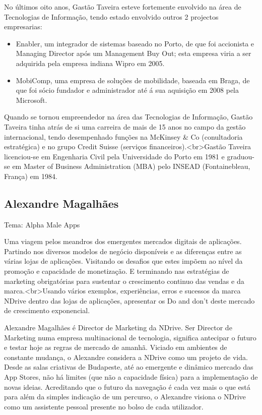 No últimos oito anos, Gastão Taveira esteve fortemente envolvido na 
área de Tecnologias de Informação, tendo estado envolvido outros 2 
projectos empresarias:\\
\begin{itemize}
\item Enabler, um integrador de sistemas baseado no Porto, de que foi accionista e Managing Director após um Management Buy Out; esta empresa viria a ser adquirida pela empresa indiana Wipro em 2005.
\item MobiComp, uma empresa de soluções de mobilidade, baseada em Braga, de que foi sócio fundador e administrador até á sua aquisição em 2008 pela Microsoft.
\end{itemize}

Quando se tornou empreendedor na área das Tecnologias de Informação, 
Gastão Taveira tinha atrás de si uma carreira de mais de 15 anos no campo da gestão internacional, tendo desempenhado funções na McKinsey \& Co (conultadoria estratégica) e no grupo Credit Suisse (serviços financeiros).<br>Gastão Taveira licenciou-se em Engenharia Civil pela Universidade do Porto em 1981 e graduou-se em Master of Business Administration (MBA) pelo INSEAD (Fontainebleau, França) em 1984.

\subsection{Alexandre Magalhães}
Tema: Alpha Male Apps

Uma viagem pelos meandros dos emergentes mercados digitais de aplicações. Partindo nos diversos modelos de negócio disponíveis e as diferenças entre as várias lojas de aplicações. Visitando os desafios que estes impõem ao nível da promoção e capacidade de monetização. E terminando nas estratégias de marketing obrigatórias para sustentar o crescimento continuo das vendas e da marca.<br>Usando vários exemplos, experiências, erros e sucessos da marca NDrive dentro das lojas de aplicações, apresentar os Do and don't deste mercado de crescimento exponencial.

Alexandre Magalhães é Director de Marketing da NDrive. Ser Director de Marketing numa empresa multinacional de tecnologia, significa antecipar o futuro e testar hoje as regras de mercado de amanhã. Viciado em ambientes de constante mudança, o Alexandre considera a NDrive como um projeto de vida. Desde as salas criativas de Budapeste, até ao emergente e dinâmico mercado das App Stores, não há limites (que não a capacidade física) para a implementação de novas ideias. Acreditando que o futuro da navegação é cada vez mais o que está para além da simples indicação de um percurso, o Alexandre visiona o NDrive como um assistente pessoal presente no bolso de cada utilizador.

